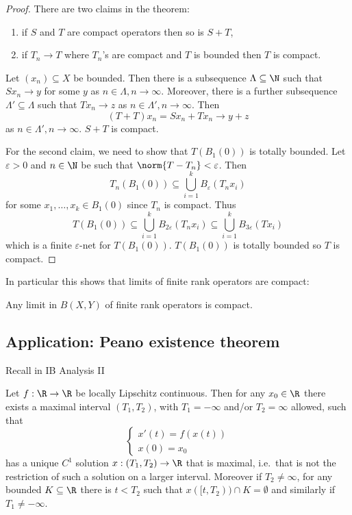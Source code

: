 \documentclass[a4paper]{article}
\begin{document}
\begin{proof}
  There are two claims in the theorem:
  \begin{enumerate}
  \item if \(S\) and \(T\) are compact operators then so is \(S + T\),
  \item if \(T_n \to T\) where \(T_n\)'s are compact and \(T\) is bounded then \(T\) is compact.
  \end{enumerate}

  Let \((x_n) \subseteq X\) be bounded. Then there is a subsequence \(\Lambda \subseteq \N\) such that \(Sx_n \to y\) for some \(y\) as \(n \in \Lambda, n \to \infty\). Moreover, there is a further subsequence \(\Lambda' \subseteq \Lambda\) such that \(Tx_n \to z\) as \(n \in \Lambda', n \to \infty\). Then
  \[
    (T + T) x_n = S x_n + T x_n \to y + z
  \]
  as \(n \in \Lambda', n \to \infty\). \(S + T\) is compact.

  For the second claim, we need to show that \(T(B_1(0))\) is totally bounded. Let \(\varepsilon > 0\) and \(n \in \N\) be such that \(\norm{T - T_n} < \varepsilon\). Then
  \[
    T_n(B_1(0)) \subseteq \bigcup_{i = 1}^k B_\varepsilon (T_nx_i)
  \]
  for some \(x_1, \dots, x_k \in B_1(0)\) since \(T_n\) is compact. Thus
  \[
    T(B_1(0)) \subseteq \bigcup_{i = 1}^k B_{2\varepsilon} (T_n x_i) \subseteq \bigcup_{i = 1}^k B_{3 \varepsilon} (Tx_i)
  \]
  which is a finite \(\varepsilon\)-net for \(T(B_1(0))\). \(T(B_1(0))\) is totally bounded so \(T\) is compact.
\end{proof}

In particular this shows that limits of finite rank operators are compact:

\begin{corollary}
  Any limit in \(B(X, Y)\) of finite rank operators is compact.
\end{corollary}

\subsection{Application: Peano existence theorem}

Recall in IB Analysis II

\begin{theorem}
  Let \(f: \R \to \R\) be locally Lipschitz continuous. Then for any \(x_0 \in \R\) there exists a maximal interval \((T_1, T_2)\), with \(T_1 = -\infty\) and/or \(T_2 = \infty\) allowed, such that
  \[
    \label{eqn:differential equation}
    \left\{
    \begin{array}{l}
      x'(t) = f(x(t)) \\
      x(0) = x_0
    \end{array}
    \right.
    \tag{\ast}
  \]
  has a unique \(C^1\) solution \(x: (T_1, T_2) \to \R\) that is maximal, i.e.\ that is not the restriction of such a solution on a larger interval. Moreover if \(T_2 \neq \infty\), for any bounded \(K \subseteq \R\) there is \(t < T_2\) such that \(x([t, T_2)) \cap K = \emptyset\) and similarly if \(T_1 \neq -\infty\).
\end{theorem}
\end{document}
